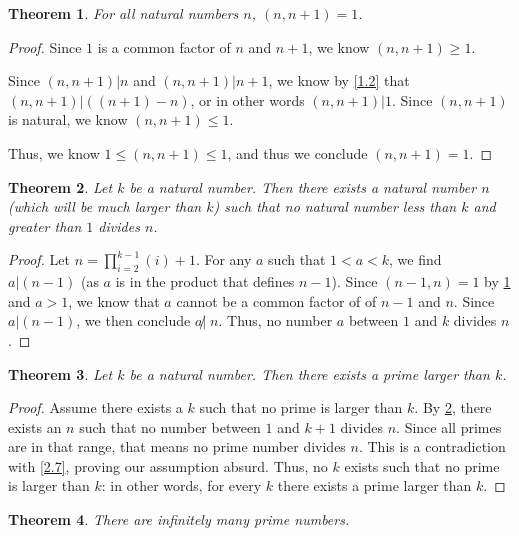 \documentclass{article}
\newtheorem{thm}{Theorem}[section]
\numberwithin{equation}{thm}
\begin{document}
\begin{thm} \label{2.32}
  For all natural numbers $n$, $(n, n+1) = 1$.
\end{thm}

\begin{proof}
  Since $1$ is a common factor of $n$ and $n+1$, we know $(n, n+1) \geq 1$.

  Since $(n,n+1) | n$ and $(n, n+1) | n+1$, we know by \ref{1.2} that $(n,n+1) | ((n+1) - n)$, or in other words $(n, n+1) | 1$. Since $(n, n+1)$ is natural, we know $(n, n+1) \leq 1$.

  Thus, we know $1 \leq (n, n+1) \leq 1$, and thus we conclude $(n, n+1) = 1$.
\end{proof}



\begin{thm} \label{2.33}
  Let $k$ be a natural number. Then there exists a natural number $n$ (which will be much larger than $k$) such that no natural number less than $k$ and greater than $1$ divides $n$.
\end{thm}

\begin{proof}
  Let $n = \prod_{i=2}^{k-1} (i) + 1$. For any $a$ such that $1 < a < k$, we find $a | (n-1)$ (as $a$ is in the product that defines $n-1$). Since $(n-1, n) = 1$ by \ref{2.32} and $a > 1$, we know that $a$ cannot be a common factor of  of $n-1$ and $n$.
  Since $a | (n-1)$, we then conclude $a \not | \; n$. Thus, no number $a$ between $1$ and $k$ divides $n$.
\end{proof}



\begin{thm} \label{2.34}
  Let $k$ be a natural number. Then there exists a prime larger than $k$.
\end{thm}

\begin{proof}
  Assume there exists a $k$ such that no prime is larger than $k$. By \ref{2.33}, there exists an $n$ such that no number between $1$ and $k+1$ divides $n$. Since all primes are in that range, that means no prime number divides $n$. This is a contradiction with \ref{2.7}, proving our assumption absurd. Thus, no $k$ exists such that no prime is larger than $k$: in other words, for every $k$ there exists a prime larger than $k$.
\end{proof}



\begin{thm} \label{2.35}
  There are infinitely many prime numbers.
\end{thm}
\end{document}
